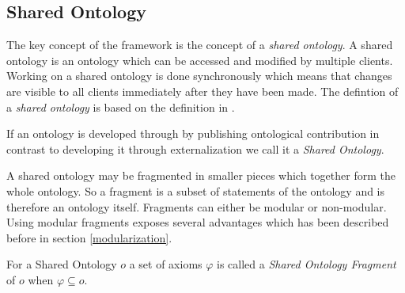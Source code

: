 \subsection{Shared Ontology}
\label{sharedOntology}
The key concept of the framework is the concept of a \emph{shared ontology}.
A shared ontology is an ontology which can be accessed and modified by
multiple clients. Working on a shared ontology is done synchronously which
means that changes are visible to all clients immediately after they have been made.
The defintion of a \emph{shared ontology} is based on the definition
in \cite{diaz2006}.

\begin{definition} If an ontology is developed
through by publishing ontological contribution in contrast to developing
it through externalization we call it a \emph{Shared Ontology}.
\end{definition}

A shared ontology may be fragmented in smaller pieces which together
form the whole ontology. So a fragment is a subset of statements of the
ontology and is therefore an ontology itself.
Fragments can either be modular or non-modular.
Using modular fragments exposes several advantages which has been described
before in section \ref{modularization}.

\begin{definition}
\label{sharedOntologyFragment}
For a Shared Ontology $o$ a set of axioms $\varphi$ is called a \emph{Shared Ontology Fragment}
of $o$ when $\varphi\subseteq o$.
\end{definition}


